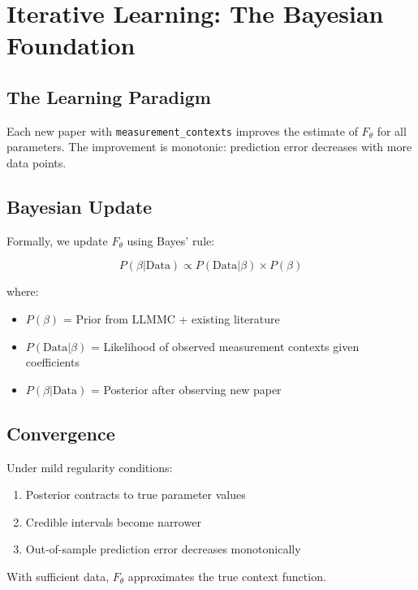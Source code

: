 
\section{Iterative Learning: The Bayesian Foundation}
\label{sec:iterative-learning}

\subsection{The Learning Paradigm}

\begin{axiom}
\label{ax:pct-5}
Each new paper with \texttt{measurement\_contexts} improves the estimate of $F_\theta$
for all parameters. The improvement is monotonic: prediction error decreases with
more data points.
\end{axiom}

\subsection{Bayesian Update}

Formally, we update $F_\theta$ using Bayes' rule:

\begin{equation}
P(\beta | \text{Data}) \propto P(\text{Data} | \beta) \times P(\beta)
\label{eq:bayes-update}
\end{equation}

where:
\begin{itemize}
    \item $P(\beta)$ = Prior from LLMMC + existing literature
    \item $P(\text{Data} | \beta)$ = Likelihood of observed measurement contexts given coefficients
    \item $P(\beta | \text{Data})$ = Posterior after observing new paper
\end{itemize}

\subsection{Convergence}

\begin{tcolorbox}[colback=blue!5!white, colframe=blue!75!black, title=Convergence Guarantee]
Under mild regularity conditions:
\begin{enumerate}
    \item Posterior contracts to true parameter values
    \item Credible intervals become narrower
    \item Out-of-sample prediction error decreases monotonically
\end{enumerate}

With sufficient data, $F_\theta$ approximates the true context function.
\end{tcolorbox}

